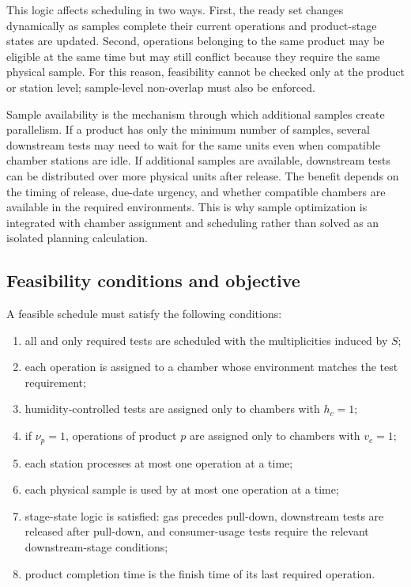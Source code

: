 \documentclass[11pt]{article}
\begin{document}
This logic affects scheduling in two ways. First, the ready set changes dynamically as samples complete their current operations and product-stage states are updated. Second, operations belonging to the same product may be eligible at the same time but may still conflict because they require the same physical sample. For this reason, feasibility cannot be checked only at the product or station level; sample-level non-overlap must also be enforced.

Sample availability is the mechanism through which additional samples create parallelism. If a product has only the minimum number of samples, several downstream tests may need to wait for the same units even when compatible chamber stations are idle. If additional samples are available, downstream tests can be distributed over more physical units after release. The benefit depends on the timing of release, due-date urgency, and whether compatible chambers are available in the required environments. This is why sample optimization is integrated with chamber assignment and scheduling rather than solved as an isolated planning calculation.

\subsection{Feasibility conditions and objective}
\label{subsec:objective}

A feasible schedule must satisfy the following conditions:
\begin{enumerate}
    \item all and only required tests are scheduled with the multiplicities induced by \(S\);
    \item each operation is assigned to a chamber whose environment matches the test requirement;
    \item humidity-controlled tests are assigned only to chambers with \(h_c=1\);
    \item if \(\nu_p=1\), operations of product \(p\) are assigned only to chambers with \(v_c=1\);
    \item each station processes at most one operation at a time;
    \item each physical sample is used by at most one operation at a time;
    \item stage-state logic is satisfied: gas precedes pull-down, downstream tests are released after pull-down, and consumer-usage tests require the relevant downstream-stage conditions;
    \item product completion time is the finish time of its last required operation.
\end{enumerate}
\end{document}
